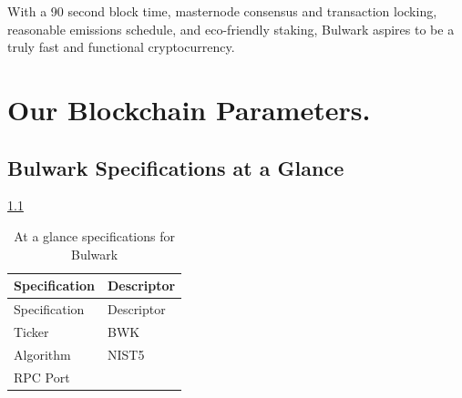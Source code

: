 \documentclass[11pt,a4paperpaper,]{report}
\begin{document}
With a 90 second block time, masternode consensus and transaction
locking, reasonable emissions schedule, and eco-friendly staking,
Bulwark aspires to be a truly fast and functional cryptocurrency.

\chapter{Our Blockchain Parameters.}\label{our-blockchain-parameters.}

\section{Bulwark Specifications at a
Glance}\label{bulwark-specifications-at-a-glance}

\ref{ref_a_table}

\begin{longtable}[]{@{}ll@{}}
\caption{At a glance specifications for Bulwark
\label{ref_a_table}}\tabularnewline
\toprule
\begin{minipage}[b]{0.35\columnwidth}\raggedright\strut
Specification\strut
\end{minipage} & \begin{minipage}[b]{0.59\columnwidth}\raggedright\strut
Descriptor\strut
\end{minipage}\tabularnewline
\midrule
\endfirsthead
\toprule
\begin{minipage}[b]{0.35\columnwidth}\raggedright\strut
Specification\strut
\end{minipage} & \begin{minipage}[b]{0.59\columnwidth}\raggedright\strut
Descriptor\strut
\end{minipage}\tabularnewline
\midrule
\endhead
\begin{minipage}[t]{0.35\columnwidth}\raggedright\strut
Ticker\strut
\end{minipage} & \begin{minipage}[t]{0.59\columnwidth}\raggedright\strut
BWK\strut
\end{minipage}\tabularnewline
\begin{minipage}[t]{0.35\columnwidth}\raggedright\strut
Algorithm\strut
\end{minipage} & \begin{minipage}[t]{0.59\columnwidth}\raggedright\strut
NIST5\strut
\end{minipage}\tabularnewline
\begin{minipage}[t]{0.35\columnwidth}\raggedright\strut
RPC Port\strut
\end{minipage} & \begin{minipage}[t]{0.59\columnwidth}\raggedright\strut

\end{minipage}
\end{longtable}
\end{document}
